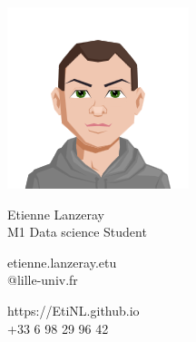 \documentclass{article}
\begin{document}
\centering \includegraphics[width=.2\linewidth]{Avatar.png}\\[5pt]
\parbox{2in}{\Large \centering Etienne Lanzeray\\[1pt]
\normalsize M1 Data science Student}

\vfill
\raggedright
\begin{multicols}{2}
\small etienne.lanzeray.etu \\
\small @lille-univ.fr

\columnbreak
\raggedleft
\small https://EtiNL.github.io \\
\small +33 6 98 29 96 42%
\end{multicols}%
\end{document}
